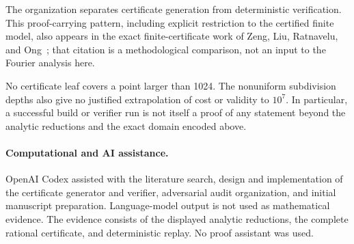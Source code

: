 \documentclass[11pt]{article}
\begin{document}
The organization separates certificate generation from deterministic
verification.  This proof-carrying pattern, including explicit restriction
to the certified finite model, also appears in the exact finite-certificate
work of Zeng, Liu, Ratnavelu, and Ong~\cite{ZengEtAl2026}; that citation is a
methodological comparison, not an input to the Fourier analysis here.

No certificate leaf covers a point larger than 1024.  The nonuniform
subdivision depths also give no justified extrapolation of cost or validity
to $10^7$.  In particular, a successful build or verifier run is not itself
a proof of any statement beyond the analytic reductions and the exact domain
encoded above.

\paragraph{Computational and AI assistance.}
OpenAI Codex assisted with the literature search, design and implementation
of the certificate generator and verifier, adversarial audit organization,
and initial manuscript preparation.  Language-model output is not used as
mathematical evidence.  The evidence consists of the displayed analytic
reductions, the complete rational certificate, and deterministic replay.
No proof assistant was used.



\end{document}
